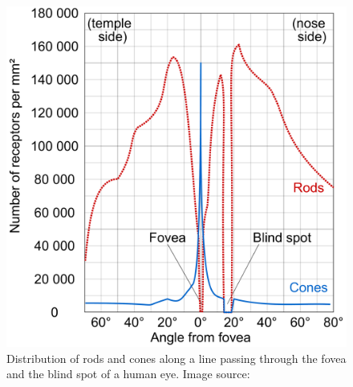 \begin{figure}[htpb!]
\centering
\includegraphics[width=0.59\columnwidth]{images/other/cones_and_rods_distribution}
\caption[Distribtion of rods and cones]{Distribution of rods and cones along a line passing through the fovea and the blind spot of a human eye. Image source:~\citet{conesandrodsdistribution}}
\label{fig:cones_and_rods_distribution}
\end{figure}

